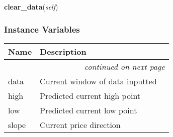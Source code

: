     \label{nukaquant:LocalExtrema:clear_data}

    \vspace{0.5ex}

\hspace{.8\funcindent}\begin{boxedminipage}{\funcwidth}

    \raggedright \textbf{clear\_data}(\textit{self})

\setlength{\parskip}{2ex}
\setlength{\parskip}{1ex}
    \end{boxedminipage}



  \subsubsection{Instance Variables}

    \vspace{-1cm}
\hspace{\varindent}\begin{longtable}{|p{\varnamewidth}|p{\vardescrwidth}|l}
\cline{1-2}
\cline{1-2} \centering \textbf{Name} & \centering \textbf{Description}& \\
\cline{1-2}
\endhead\cline{1-2}\multicolumn{3}{r}{\small\textit{continued on next page}}\\\endfoot\cline{1-2}
\endlastfoot\raggedright d\-a\-t\-a\- & Current window of data inputted&\\
\cline{1-2}
\raggedright h\-i\-g\-h\- & Predicted current high point&\\
\cline{1-2}
\raggedright l\-o\-w\- & Predicted current low point&\\
\cline{1-2}
\raggedright s\-l\-o\-p\-e\- & Current price direction&\\
\cline{1-2}
\end{longtable}



